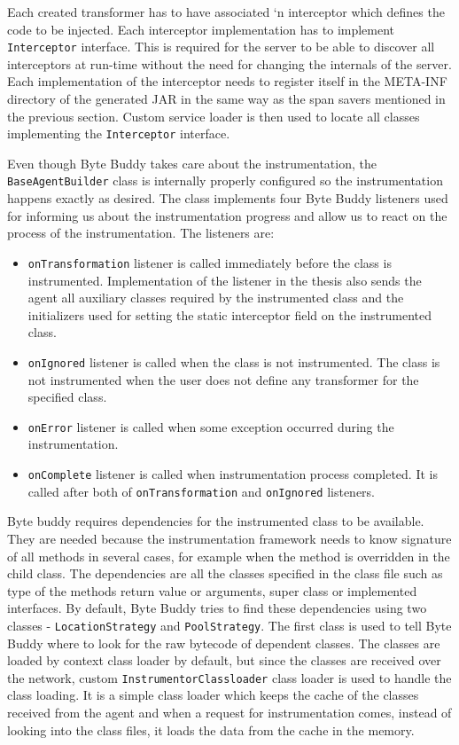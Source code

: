 Each created transformer has to have associated `n interceptor which defines the code to be injected. Each interceptor implementation has to implement \texttt{Interceptor}  interface. This is required for the server to be able to discover all interceptors at run-time without the need for changing the internals of the server. Each implementation of the interceptor needs to register itself in the META-INF directory of the generated JAR in the same way as the span savers mentioned in the previous section. Custom service loader is then used to locate all classes implementing the \texttt{Interceptor} interface.

Even though Byte Buddy takes care about the instrumentation, the \texttt{BaseAgentBuilder} class is internally properly configured so the instrumentation happens exactly as desired. The class implements four Byte Buddy listeners used for informing us about the instrumentation progress and allow us to react on the process of the instrumentation. The listeners are:
\begin{itemize}
	\item \texttt{onTransformation} listener is called immediately before the class is instrumented.  Implementation of the listener in the thesis also sends the agent all auxiliary classes required by the instrumented class and the initializers used for setting the static interceptor field on the instrumented class.
	\item \texttt{onIgnored} listener is called when the class is not instrumented. The class is not instrumented when the user does not define any transformer for the specified class.
	\item \texttt{onError} listener is called when some exception occurred during the instrumentation.
	\item \texttt{onComplete} listener is called when instrumentation process completed. It is called after both of \texttt{onTransformation} and \texttt{onIgnored} listeners.
\end{itemize}

Byte buddy requires dependencies for the instrumented class to be available. They are needed because the instrumentation framework needs to know signature of all methods in several cases, for example when the method is overridden in the child class. The dependencies are all the classes specified in the class file such as type of the methods return value or arguments, super class or implemented interfaces. 
By default, Byte Buddy tries to find these dependencies using two classes - \texttt{LocationStrategy} and \texttt{PoolStrategy}. The first class is used to tell Byte Buddy where to look for the raw bytecode of dependent classes. The classes are loaded by context class loader by default, but since the classes are received over the network, custom \texttt{InstrumentorClassloader} class loader is used to handle the class loading. It is a simple class loader which keeps the cache of the classes received from the agent and when a request for instrumentation comes, instead of looking into the class files, it loads the data from the cache in the memory.


